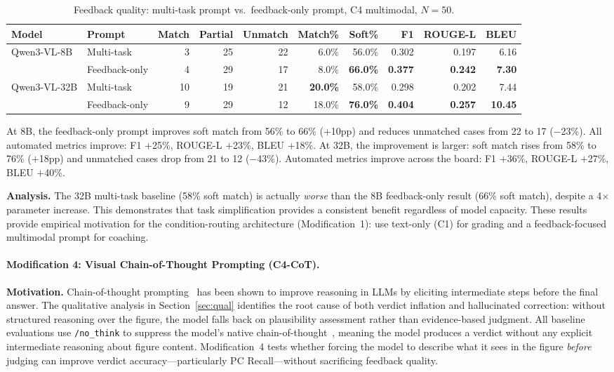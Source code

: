\documentclass{article}
\begin{document}
\begin{table}[ht]
\centering
\small
\caption{Feedback quality: multi-task prompt vs.\ feedback-only prompt, C4 multimodal, $N{=}50$.}
\label{tab:modification3}
\begin{tabular}{@{}llrrrrrrrr@{}}
\toprule
Model & Prompt & Match & Partial & Unmatch & Match\% & Soft\% & F1 & ROUGE-L & BLEU \\
\midrule
\multirow{2}{*}{Qwen3-VL-8B}
 & Multi-task & 3  & 25 & 22 & 6.0\%  & 56.0\% & 0.302 & 0.197 & 6.16 \\
 & Feedback-only & 4  & 29 & 17 & 8.0\%  & \textbf{66.0\%} & \textbf{0.377} & \textbf{0.242} & \textbf{7.30} \\
\midrule
\multirow{2}{*}{Qwen3-VL-32B}
 & Multi-task & 10 & 19 & 21 & \textbf{20.0\%} & 58.0\% & 0.298 & 0.202 & 7.44 \\
 & Feedback-only & 9  & 29 & 12 & 18.0\% & \textbf{76.0\%} & \textbf{0.404} & \textbf{0.257} & \textbf{10.45} \\
\bottomrule
\end{tabular}
\end{table}

At 8B, the feedback-only prompt improves soft match from 56\% to 66\% ($+$10pp) and reduces unmatched cases from 22 to 17 ($-$23\%). All automated metrics improve: F1 $+$25\%, ROUGE-L $+$23\%, BLEU $+$18\%. At 32B, the improvement is larger: soft match rises from 58\% to 76\% ($+$18pp) and unmatched cases drop from 21 to 12 ($-$43\%). Automated metrics improve across the board: F1 $+$36\%, ROUGE-L $+$27\%, BLEU $+$40\%.

\textbf{Analysis.} The 32B multi-task baseline (58\% soft match) is actually \emph{worse} than the 8B feedback-only result (66\% soft match), despite a 4$\times$ parameter increase. This demonstrates that task simplification provides a consistent benefit regardless of model capacity. These results provide empirical motivation for the condition-routing architecture (Modification~1): use text-only (C1) for grading and a feedback-focused multimodal prompt for coaching.

\paragraph{Modification 4: Visual Chain-of-Thought Prompting (C4-CoT).}

\textbf{Motivation.} Chain-of-thought prompting~\cite{wei2022cot} has been shown to
improve reasoning in LLMs by eliciting intermediate steps before the final answer.
The qualitative analysis in Section~\ref{sec:qual} identifies
the root cause of both verdict inflation and hallucinated correction: without
structured reasoning over the figure, the model falls back on plausibility assessment
rather than evidence-based judgment. All baseline evaluations use \texttt{/no\_think}
to suppress the model's native chain-of-thought~\cite{kojima2022zeroshotcot}, meaning the model produces a
verdict without any explicit intermediate reasoning about figure content.
Modification~4 tests whether forcing the model to describe what it sees in the figure
\textit{before} judging can improve verdict accuracy---particularly PC Recall---without
sacrificing feedback quality.
\end{document}
